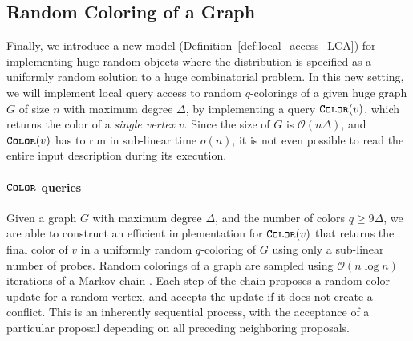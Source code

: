 \subsection{Random Coloring of a Graph}
\label{sec:overview_random_coloring_of_a_graph}
Finally, we introduce a new model (Definition~\ref{def:local_access_LCA}) for implementing huge random objects
where the distribution is specified as a uniformly random solution to a huge combinatorial problem.
In this new setting, we will implement local query access to random $q$-colorings of a given huge graph $G$ of size $n$ with maximum degree $\Delta$,
by implementing a query $\texttt{\textsc{Color}}(v)$, which returns the color of a \emph{single vertex} $v$.
Since the size of $G$ is $\mathcal O(n\Delta)$, and $\texttt{\textsc{Color}}(v)$ has to run in sub-linear time $o(n)$,
it is not even possible to read the entire input description during its execution.


\paragraph*{$\texttt{\textsc{Color}}$ queries}
\label{par:color_queries}
Given a graph $G$ with maximum degree $\Delta$, and the number of colors $q\ge 9\Delta$,
we are able to construct an efficient implementation for $\texttt{\textsc{Color}}(v)$ that returns the final color of $v$
in a uniformly random $q$-coloring of $G$ using only a sub-linear number of probes.
Random colorings of a graph are sampled using $\mathcal O(n\log n)$ iterations of a Markov chain \cite{glauber_survey}.
Each step of the chain proposes a random color update for a random vertex, and accepts the update if it does not create a conflict.
This is an inherently sequential process, with the acceptance of a particular proposal depending on all preceding neighboring proposals.

